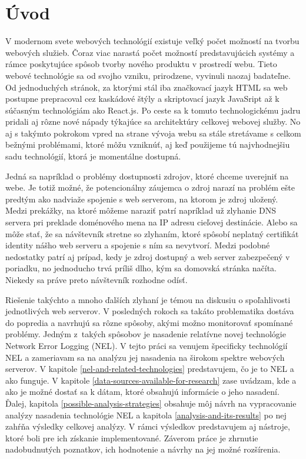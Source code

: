 \chapter{Úvod}
\label{uvod}
\vspace{1cm}

V modernom svete webových technológií existuje veľký počet možností na tvorbu webových služieb. Čoraz viac narastá počet možností predstavujúcich systémy a rámce poskytujúce spôsob tvorby nového produktu v prostredí webu.
Tieto webové technológie sa od svojho vzniku, prirodzene, vyvinuli naozaj badateľne. 
Od jednoduchých stránok, za ktorými stál iba značkovací jazyk 
HTML sa web postupne prepracoval cez kaskádové štýly a skriptovací jazyk 
JavaSript až k súčasným technológiám ako React.js. 
Po ceste sa k tomuto technologickému jadru pridali aj rôzne 
nové nápady týkajúce sa architektúry celkovej webovej služby.
No aj s takýmto pokrokom vpred na strane vývoja webu sa stále stretávame s celkom bežnými problémami, ktoré môžu vzniknúť, aj 
keď použijeme tú najvhodnejšiu sadu technológií, ktorá je momentálne dostupná.

Jedná sa napríklad o problémy dostupnosti zdrojov, ktoré chceme uverejniť na webe. 
Je totiž možné, že potencionálny záujemca o zdroj narazí na problém ešte predtým ako nadviaže spojenie s web serverom, na ktorom je zdroj uložený.
Medzi prekážky, na ktoré môžeme naraziť patrí napríklad už zlyhanie DNS servera pri preklade doménového mena na IP adresu cieľovej destinácie. 
Alebo sa môže stať, že sa návštevník stretne so zlyhaním, ktoré spôsobí neplatný certifikát identity nášho web serveru a spojenie s ním sa nevytvorí. 
Medzi podobné nedostatky patrí aj prípad, kedy je zdroj dostupný a web server zabezpečený v poriadku, no jednoducho trvá príliš dlho, kým sa domovská stránka načíta. Niekedy sa práve preto návštevník rozhodne odísť.

Riešenie takýchto a mnoho ďalších zlyhaní je témou na diskusiu o spoľahlivosti jednotlivých web serverov. 
V posledných rokoch sa takáto problematika dostáva do popredia a navrhujú sa rôzne 
spôsoby, akými možno monitorovať spomínané problémy. Jedným \mbox{z takých} spôsobov je nasadenie relatívne novej 
technológie Network Error Logging (NEL).
V tejto práci sa venujem špecificky technológií NEL a zameriavam sa na analýzu jej nasadenia na širokom spektre webových serverov. 
V kapitole \ref{nel-and-related-technologies} predstavujem, čo je to NEL a ako funguje. V kapitole \ref{data-sources-available-for-research} zase uvádzam, kde a ako je možné dostať sa k dátam, ktoré obsahujú informácie o jeho nasadení.
Ďalej, kapitola \ref{possible-analysis-strategies} obsahuje môj návrh na vypracovanie analýzy nasadenia technológie NEL a kapitola \ref{analysis-and-its-results} po nej zahŕňa výsledky celkovej analýzy.
V rámci výsledkov predstavujem aj nástroje, ktoré boli pre ich získanie implementované. Záverom práce je zhrnutie nadobudnutých poznatkov, ich hodnotenie a návrhy na jej možné rozšírenia.
